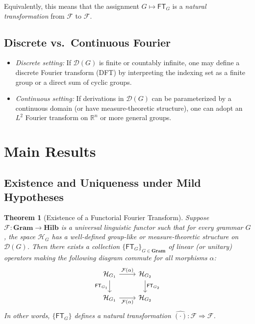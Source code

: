 \documentclass[11pt]{article}
\newtheorem{theorem}{Theorem}[section]
\begin{document}
Equivalently, this means that the assignment \(G \mapsto \mathsf{FT}_G\) is a \emph{natural transformation} from \(\mathcal{F}\) to \(\mathcal{F}\).

\subsection{Discrete vs.~Continuous Fourier}

\begin{itemize}
\item \emph{Discrete setting:} If \(\mathcal{D}(G)\) is finite or countably infinite, one may define a discrete Fourier transform (DFT) by interpreting the indexing set as a finite group or a direct sum of cyclic groups.
\item \emph{Continuous setting:} If derivations in \(\mathcal{D}(G)\) can be parameterized by a continuous domain (or have measure-theoretic structure), one can adopt an \(L^2\) Fourier transform on \(\mathbb{R}^n\) or more general groups.
\end{itemize}

\section{Main Results}

\subsection{Existence and Uniqueness under Mild Hypotheses}

\begin{theorem}[Existence of a Functorial Fourier Transform]
\label{thm:existence-fft}
Suppose \(\mathcal{F}: \mathbf{Gram} \to \mathbf{Hilb}\) is a universal linguistic functor such that for every grammar \(G\), the space \(\mathcal{H}_G\) has a well-defined group-like or measure-theoretic structure on \(\mathcal{D}(G)\). Then there exists a collection \(\{\mathsf{FT}_G\}_{G \in \mathbf{Gram}}\) of linear (or unitary) operators making the following diagram commute for all morphisms \(\alpha\):
\[
\begin{tikzcd}
\mathcal{H}_{G_1} \arrow[r, "\mathcal{F}(\alpha)"] \arrow[d, "\mathsf{FT}_{G_1}"']
& \mathcal{H}_{G_2} \arrow[d, "\mathsf{FT}_{G_2}"] \\
\mathcal{H}_{G_1} \arrow[r, "\mathcal{F}(\alpha)"']
& \mathcal{H}_{G_2}
\end{tikzcd}
\]
In other words, \(\{\mathsf{FT}_G\}\) defines a natural transformation \(\widehat{(\cdot)} : \mathcal{F} \Rightarrow \mathcal{F}\).
\end{theorem}
\end{document}
